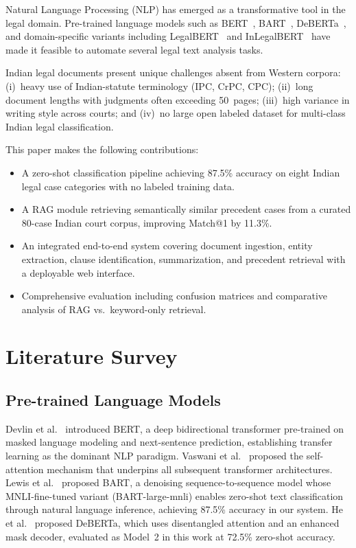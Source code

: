 \documentclass[conference]{IEEEtran}
\begin{document}
Natural Language Processing (NLP) has emerged as a transformative tool in the
legal domain. Pre-trained language models such as BERT~\cite{devlin2019bert},
BART~\cite{lewis2020bart}, DeBERTa~\cite{he2021deberta}, and domain-specific
variants including LegalBERT~\cite{chalkidis2020legalbert} and
InLegalBERT~\cite{malik2021ildc} have made it feasible to automate several
legal text analysis tasks.

Indian legal documents present unique challenges absent from Western corpora:
(i)~heavy use of Indian-statute terminology (IPC, CrPC, CPC);
(ii)~long document lengths with judgments often exceeding 50~pages;
(iii)~high variance in writing style across courts; and
(iv)~no large open labeled dataset for multi-class Indian legal classification.

This paper makes the following contributions:
\begin{itemize}
    \item A zero-shot classification pipeline achieving 87.5\% accuracy on
          eight Indian legal case categories with no labeled training data.
    \item A RAG module retrieving semantically similar precedent cases from a
          curated 80-case Indian court corpus, improving Match@1 by 11.3\%.
    \item An integrated end-to-end system covering document ingestion, entity
          extraction, clause identification, summarization, and precedent
          retrieval with a deployable web interface.
    \item Comprehensive evaluation including confusion matrices and comparative
          analysis of RAG vs.\ keyword-only retrieval.
\end{itemize}

\section{Literature Survey}

\subsection{Pre-trained Language Models}

Devlin et al.~\cite{devlin2019bert} introduced BERT, a deep bidirectional
transformer pre-trained on masked language modeling and next-sentence
prediction, establishing transfer learning as the dominant NLP paradigm.
Vaswani et al.~\cite{vaswani2017attention} proposed the self-attention
mechanism that underpins all subsequent transformer architectures. Lewis
et al.~\cite{lewis2020bart} proposed BART, a denoising sequence-to-sequence
model whose MNLI-fine-tuned variant (BART-large-mnli) enables zero-shot
text classification through natural language inference, achieving 87.5\%
accuracy in our system. He et al.~\cite{he2021deberta} proposed DeBERTa,
which uses disentangled attention and an enhanced mask decoder, evaluated
as Model~2 in this work at 72.5\% zero-shot accuracy.
\end{document}
